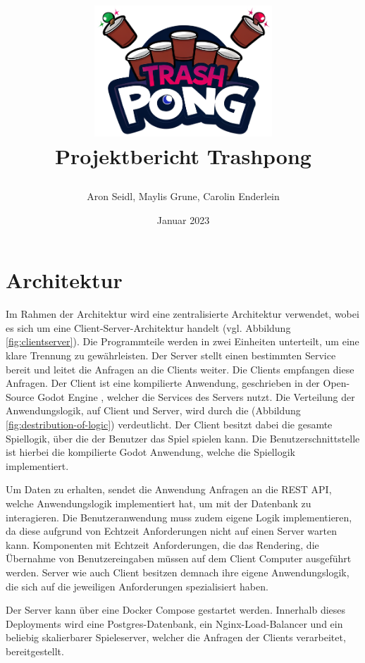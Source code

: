 \documentclass[
]{article}
\title{
  \begin{center}
    \includegraphics[width=0.5\textwidth]{resources/header.png} \\
    Projektbericht Trashpong
  \end{center}
}
\author{Aron Seidl, Maylis Grune, Carolin Enderlein}
\date{Januar 2023}
\begin{document}
\maketitle

\hypertarget{section-introduction-and-goals}{%
\section{Architektur}\label{section-introduction-and-goals}}

Im Rahmen der Architektur wird eine zentralisierte Architektur verwendet, wobei es sich um eine Client-Server-Architektur handelt (vgl. Abbildung \ref{fig:clientserver}).
Die Programmteile werden in zwei Einheiten unterteilt, um eine klare Trennung zu gewährleisten. 
Der Server stellt einen bestimmten Service bereit und leitet die Anfragen an die Clients weiter. 
Die Clients empfangen diese Anfragen.\cite{tanenbaum2007distributed}
Der Client ist eine kompilierte Anwendung, geschrieben in der Open-Source Godot Engine \cite{godot}, welcher die
Services des Servers nutzt. 
Die Verteilung der Anwendungslogik, auf Client und Server, wird durch die (Abbildung \ref{fig:destribution-of-logic}) verdeutlicht.
Der Client besitzt dabei die gesamte Spiellogik, über die der Benutzer das Spiel spielen kann. 
Die Benutzerschnittstelle ist hierbei die kompilierte Godot Anwendung, welche die Spiellogik implementiert.

Um Daten zu erhalten, sendet die Anwendung Anfragen an die REST API, welche Anwendungslogik implementiert hat, um mit der Datenbank zu interagieren.
Die Benutzeranwendung muss zudem eigene Logik implementieren, da diese aufgrund von Echtzeit Anforderungen nicht auf einen Server warten kann.
Komponenten mit Echtzeit Anforderungen, die das  Rendering, die Übernahme von Benutzereingaben müssen auf dem Client Computer ausgeführt werden.
Server wie auch Client besitzen demnach ihre eigene Anwendungslogik, die sich auf die jeweiligen Anforderungen spezialisiert haben.

Der Server kann über eine Docker Compose gestartet werden.
Innerhalb dieses Deployments wird eine Postgres-Datenbank, 
ein Nginx-Load-Balancer und ein beliebig skalierbarer Spieleserver, welcher die Anfragen der Clients verarbeitet, bereitgestellt.
\end{document}
